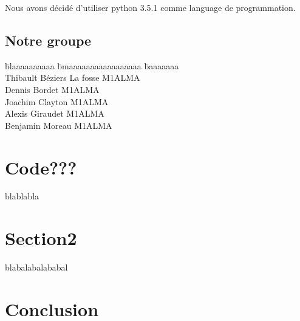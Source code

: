 \documentclass{article}
\begin{document}
Nous avons décidé d'utiliser python 3.5.1 comme language de programmation. 

\vspace{1cm}




\subsection{Notre groupe}

\vspace{1cm}

\begin{tabbing}


\=blaaaaaaaaaa	\=bmaaaaaaaaaaaaaaaaa		\=baaaaaaa\kill \\
\>Thibault 	\>Béziers La fosse		\>M1ALMA\\
\>Dennis	\>Bordet			\>M1ALMA\\
\>Joachim	\>Clayton			\>M1ALMA\\
\>Alexis	\>Giraudet			\>M1ALMA\\
\>Benjamin 	\>Moreau			\>M1ALMA\\


\end{tabbing}

\vspace{1cm}
\section{Code???}
\vspace{2cm}


blablabla

\vspace{1cm}
\section{Section2}
\vspace{2cm}


blabalabalababal


\vspace{1cm}
\section{Conclusion}
\vspace{2cm}
\end{document}
